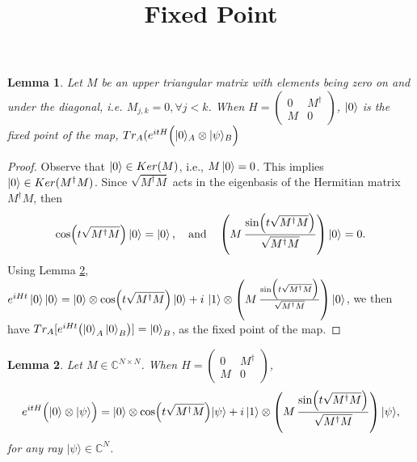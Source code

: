 \documentclass{article}
\newtheorem{lemma}{Lemma}
\begin{document}
\title{Fixed Point}
\maketitle
\begin{lemma}
Let $M$ be an upper triangular matrix with elements being zero on and under the diagonal, i.e. $M_{j,k}=0, \forall j<k$. When \(H = \begin{pmatrix} 0 & M^\dagger \\ M & 0 \end{pmatrix}\), $\Ket{0}$ is the fixed point of the map, 
\(
Tr_A(e^{itH}\Bigl(|0\rangle_A \otimes|\psi\rangle_B \Bigr)\)
\end{lemma}


\begin{proof}
    Observe that $\ket{0} \in Ker(M)$, i.e., $M\ket{0}=0$. This implies $\ket{0} \in Ker(M^{\dagger}M)$. 
    Since $\sqrt{M^{\dagger}M}$ acts in the eigenbasis of the Hermitian matrix $M^{\dagger}M$, then 
    \[ \cos\Bigl(t\sqrt{M^\dagger M}\Bigr)\ket{0} = \ket{0}, \quad \text{and} \quad \left(M\,\frac{\sin\Bigl(t\sqrt{M^\dagger M}\Bigr)}{\sqrt{M^\dagger M}}\right)\ket{0} = 0. \]
    Using Lemma \ref{simplification}, 
    \(e^{iHt}\ket{0}\ket{0} =\ket{0}\otimes \cos\Bigl(t\sqrt{M^\dagger M}\Bigr) \ket{0} + i\,\ket{1}\otimes \left(M\,\frac{\sin\Bigl(t\sqrt{M^\dagger M}\Bigr)}{\sqrt{M^\dagger M}}\right)\ket{0}\), we then have \(Tr_A[e^{iHt}\bigl(\ket{0}_A\ket{0}_B\bigr)] = \ket{0}_B\), as the fixed point of the map.
\end{proof}



\newpage
\begin{lemma}
\label{simplification}
Let \(M\in\mathbb{C}^{N\times N}\). When
\(H = \begin{pmatrix} 0 & M^\dagger \\ M & 0 \end{pmatrix}\), \[
e^{itH}\Bigl(|0\rangle\otimes|\psi\rangle\Bigr) = |0\rangle\otimes \cos\Bigl(t\sqrt{M^\dagger M}\Bigr)|\psi\rangle + i\,|1\rangle\otimes \left(M\,\frac{\sin\Bigl(t\sqrt{M^\dagger M}\Bigr)}{\sqrt{M^\dagger M}}\right)|\psi\rangle,
\]
for any ray \( |\psi\rangle\in \mathbb{C}^{N}\).
\end{lemma}
\end{document}
